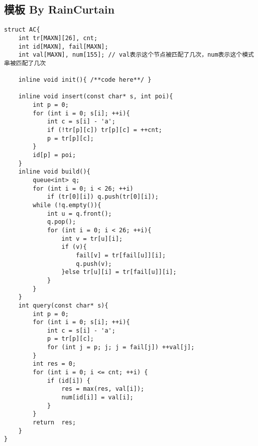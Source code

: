 \subsection{模板 By RainCurtain}
\begin{lstlisting}
struct AC{
    int tr[MAXN][26], cnt;
    int id[MAXN], fail[MAXN];
    int val[MAXN], num[155]; // val表示这个节点被匹配了几次，num表示这个模式串被匹配了几次

    inline void init(){ /**code here**/ }

    inline void insert(const char* s, int poi){
        int p = 0;
        for (int i = 0; s[i]; ++i){
            int c = s[i] - 'a';
            if (!tr[p][c]) tr[p][c] = ++cnt;
            p = tr[p][c];
        }
        id[p] = poi;
    }
    inline void build(){
        queue<int> q;
        for (int i = 0; i < 26; ++i)
            if (tr[0][i]) q.push(tr[0][i]);
        while (!q.empty()){
            int u = q.front();
            q.pop();
            for (int i = 0; i < 26; ++i){
                int v = tr[u][i];
                if (v){
                    fail[v] = tr[fail[u]][i];
                    q.push(v);
                }else tr[u][i] = tr[fail[u]][i];
            }
        }
    }
    int query(const char* s){
        int p = 0;
        for (int i = 0; s[i]; ++i){
            int c = s[i] - 'a';
            p = tr[p][c];
            for (int j = p; j; j = fail[j]) ++val[j];
        }
        int res = 0;
        for (int i = 0; i <= cnt; ++i) {
            if (id[i]) {
                res = max(res, val[i]);
                num[id[i]] = val[i];
            }
        }
        return  res;
    }
}
\end{lstlisting}